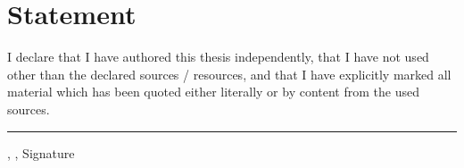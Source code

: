 {}
\thispagestyle{empty}
\chapter*{Statement}
I declare that I have authored this thesis independently, that I have not used other than the declared
sources / resources, and that I have explicitly marked all material which has been quoted either
literally or by content from the used sources. 

\vspace{18.1mm}
\rule[-3.7mm]{\linewidth}{0.5pt}
\Ort{}, \Datum{}, Signature